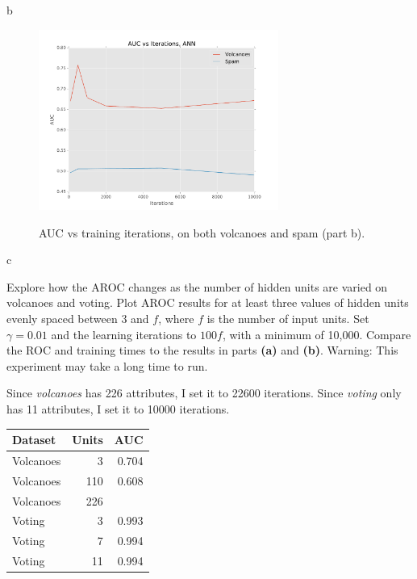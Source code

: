 \documentclass[fleqn]{homework}
\begin{document}
\begin{problem}{b}
    \begin{figure}
      \centering
      \caption{AUC vs training iterations, on both volcanoes and spam (part b).}
      \includegraphics[width=0.7\textwidth]{partb.pdf}
      \label{fig:part-b}
    \end{figure}
  \end{problem}

  \begin{problem}{c}
    \begin{question}
      Explore how the AROC changes as the number of hidden units are varied on
      volcanoes and voting.  Plot AROC results for at least three values of
      hidden units evenly spaced between 3 and $f$, where $f$ is the number of
      input units. Set $\gamma=0.01$ and the learning iterations to $100f$, with
      a minimum of 10,000.  Compare the ROC and training times to the results in
      parts \textbf{(a)} and \textbf{(b)}. Warning: This experiment may take a
      long time to run.
    \end{question}

    Since \textit{volcanoes} has 226 attributes, I set it to 22600 iterations.
    Since \textit{voting} only has 11 attributes, I set it to 10000 iterations.

    \begin{tabular}{|lrr|}
      \hline
      Dataset & Units & AUC \\
      \hline
      Volcanoes & 3 & 0.704 \\
      Volcanoes & 110 & 0.608 \\
      Volcanoes & 226 &  \\
      Voting & 3 & 0.993 \\
      Voting & 7 & 0.994 \\
      Voting & 11 & 0.994 \\
    \end{tabular}

  \end{problem}
\end{document}
